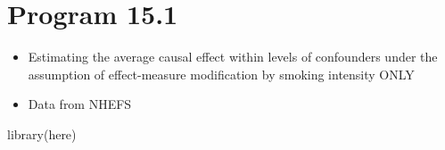 \documentclass[
  10pt,
  a4paper,
]{book}
\newenvironment{Shaded}{\begin{snugshade}}{\end{snugshade}}
\newcommand{\FunctionTok}[1]{\textcolor[rgb]{0.28,0.35,0.67}{#1}}
\newcommand{\NormalTok}[1]{\textcolor[rgb]{0.00,0.46,0.62}{#1}}
\providecommand{\tightlist}{%
  \setlength{\itemsep}{0pt}\setlength{\parskip}{0pt}}
\begin{document}
\hypertarget{program-15.1}{%
\section{Program 15.1}\label{program-15.1}}

\begin{itemize}
\tightlist
\item
  Estimating the average causal effect within levels of confounders under the assumption of effect-measure modification by smoking intensity ONLY
\item
  Data from NHEFS
\end{itemize}

\begin{Shaded}
\begin{Highlighting}[]
\FunctionTok{library}\NormalTok{(here)}
\end{Highlighting}
\end{Shaded}
\end{document}
